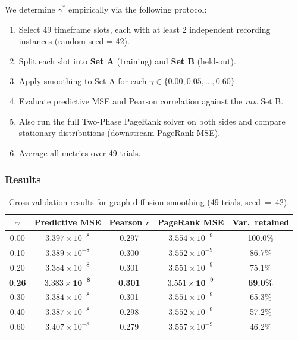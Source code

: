 \documentclass[12pt,a4paper]{article}
\theoremstyle{definition}
\theoremstyle{plain}
\begin{document}
We determine $\gamma^*$ empirically via the following protocol:
\begin{enumerate}[label=\textbf{Step~\arabic*.}]
  \item Select 49 timeframe slots, each with at least 2 independent recording instances
    (random seed = 42).
  \item Split each slot into \textbf{Set A} (training) and \textbf{Set B} (held-out).
  \item Apply smoothing to Set A for each $\gamma \in \{0.00, 0.05, \ldots, 0.60\}$.
  \item Evaluate predictive MSE and Pearson correlation against the \emph{raw} Set B.
  \item Also run the full Two-Phase PageRank solver on both sides and compare stationary
    distributions (downstream PageRank MSE).
  \item Average all metrics over 49 trials.
\end{enumerate}

\subsubsection{Results}

\begin{table}[H]
  \centering
  \caption{Cross-validation results for graph-diffusion smoothing (49 trials,
    seed~=~42).}
  \label{tab:smoothing_full}
  \begin{tabular}{@{}ccccc@{}}
    \toprule
    $\gamma$ & Predictive MSE & Pearson $r$ & PageRank MSE & Var.\ retained\\
    \midrule
    0.00 & $3.397 \times 10^{-8}$ & 0.297 & $3.554 \times 10^{-9}$ & 100.0\%\\
    0.10 & $3.389 \times 10^{-8}$ & 0.300 & $3.552 \times 10^{-9}$ & 86.7\%\\
    0.20 & $3.384 \times 10^{-8}$ & 0.301 & $3.551 \times 10^{-9}$ & 75.1\%\\
    \textbf{0.26} & $\mathbf{3.383 \times 10^{-8}}$ & \textbf{0.301} &
      $\mathbf{3.551 \times 10^{-9}}$ & \textbf{69.0\%}\\
    0.30 & $3.384 \times 10^{-8}$ & 0.301 & $3.551 \times 10^{-9}$ & 65.3\%\\
    0.40 & $3.387 \times 10^{-8}$ & 0.298 & $3.552 \times 10^{-9}$ & 57.2\%\\
    0.60 & $3.407 \times 10^{-8}$ & 0.279 & $3.557 \times 10^{-9}$ & 46.2\%\\
    \bottomrule
  \end{tabular}
\end{table}
\end{document}
